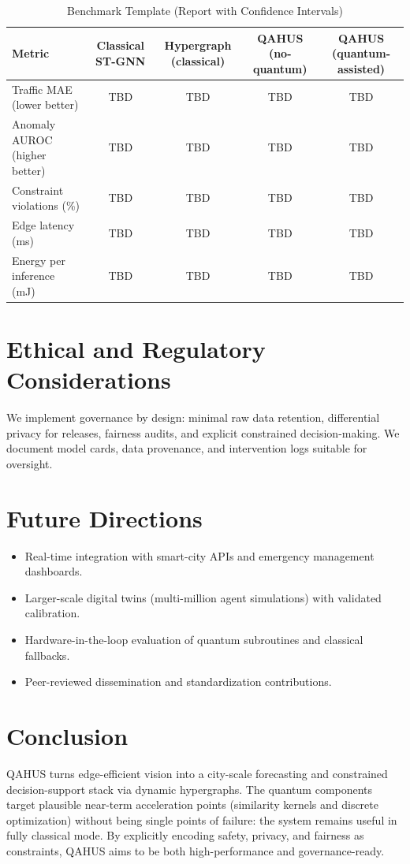 \documentclass[11pt]{article}
\begin{document}
\begin{table}[t]
\centering
\caption{Benchmark Template (Report with Confidence Intervals)}
\begin{tabular}{lcccc}
\toprule
Metric & Classical ST-GNN & Hypergraph (classical) & QAHUS (no-quantum) & QAHUS (quantum-assisted)\\
\midrule
Traffic MAE (lower better) & TBD & TBD & TBD & TBD \\
Anomaly AUROC (higher better) & TBD & TBD & TBD & TBD \\
Constraint violations (\%) & TBD & TBD & TBD & TBD \\
Edge latency (ms) & TBD & TBD & TBD & TBD \\
Energy per inference (mJ) & TBD & TBD & TBD & TBD \\
\bottomrule
\end{tabular}
\end{table}

\section{Ethical and Regulatory Considerations}
We implement governance by design: minimal raw data retention, differential privacy for releases,
fairness audits, and explicit constrained decision-making. We document model cards, data provenance,
and intervention logs suitable for oversight.

\section{Future Directions}
\begin{itemize}[leftmargin=*]
\item Real-time integration with smart-city APIs and emergency management dashboards.
\item Larger-scale digital twins (multi-million agent simulations) with validated calibration.
\item Hardware-in-the-loop evaluation of quantum subroutines and classical fallbacks.
\item Peer-reviewed dissemination and standardization contributions.
\end{itemize}

\section{Conclusion}
QAHUS turns edge-efficient vision into a city-scale forecasting and constrained decision-support stack
via dynamic hypergraphs. The quantum components target plausible near-term acceleration points
(similarity kernels and discrete optimization) without being single points of failure: the system remains
useful in fully classical mode. By explicitly encoding safety, privacy, and fairness as constraints,
QAHUS aims to be both high-performance and governance-ready.



\end{document}
